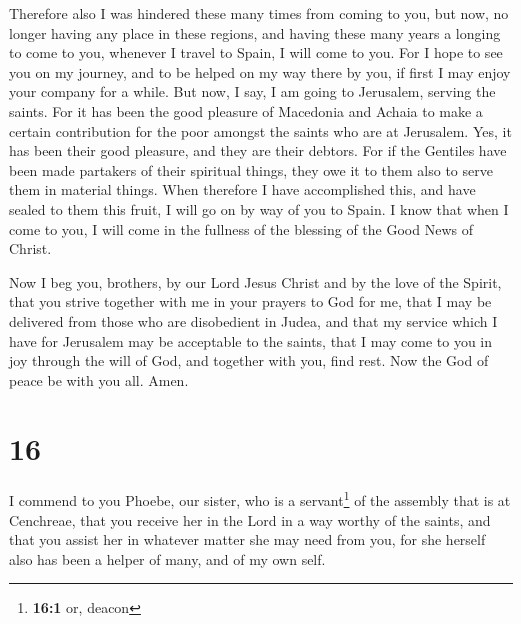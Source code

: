  Therefore also I was hindered these many times from
coming to you,  but now, no longer having any place in
these regions, and having these many years a longing to come to you,
 whenever I travel to Spain, I will come to you. For I
hope to see you on my journey, and to be helped on my way there by you,
if first I may enjoy your company for a while.  But now,
I say, I am going to Jerusalem, serving the saints.  For
it has been the good pleasure of Macedonia and Achaia to make a certain
contribution for the poor amongst the saints who are at Jerusalem.
 Yes, it has been their good pleasure, and they are their
debtors. For if the Gentiles have been made partakers of their spiritual
things, they owe it to them also to serve them in material things.
 When therefore I have accomplished this, and have sealed
to them this fruit, I will go on by way of you to Spain. 
I know that when I come to you, I will come in the fullness of the
blessing of the Good News of Christ.

 Now I beg you, brothers, by our Lord Jesus Christ and by
the love of the Spirit, that you strive together with me in your prayers
to God for me,  that I may be delivered from those who
are disobedient in Judea, and that my service which I have for Jerusalem
may be acceptable to the saints,  that I may come to you
in joy through the will of God, and together with you, find rest.
 Now the God of peace be with you all. Amen.

\hypertarget{section-15}{%
\section{16}\label{section-15}}

 I commend to you Phoebe, our sister, who is a
servant\footnote{\textbf{16:1} or, deacon} of the assembly that is at
Cenchreae,  that you receive her in the Lord in a way
worthy of the saints, and that you assist her in whatever matter she may
need from you, for she herself also has been a helper of many, and of my
own self.

